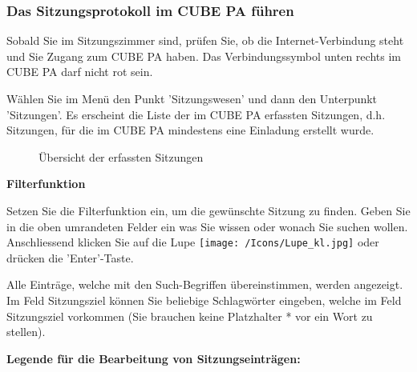 \subsubsection{Das Sitzungsprotokoll im CUBE PA führen}

Sobald Sie im Sitzungszimmer sind, prüfen Sie, ob die Internet-Verbindung steht und Sie Zugang zum CUBE PA haben. Das Verbindungssymbol unten rechts im CUBE PA darf nicht rot sein.

\vspace{\baselineskip}

Wählen Sie im Menü den Punkt 'Sitzungswesen' und dann den Unterpunkt 'Sitzungen'. Es erscheint die Liste der im CUBE PA erfassten Sitzungen, d.h. Sitzungen, für die im CUBE PA mindestens eine Einladung erstellt wurde. 

\begin{figure}[H]
\caption{Übersicht der erfassten Sitzungen}
\end{figure}

\textbf{Filterfunktion }

Setzen Sie die Filterfunktion ein, um die gewünschte Sitzung zu finden. Geben Sie in die oben umrandeten Felder ein was Sie wissen oder wonach Sie suchen wollen. Anschliessend klicken Sie auf die Lupe \texttt{[image: /Icons/Lupe\_kl.jpg]} oder drücken die 'Enter'-Taste.

\vspace{\baselineskip}

Alle Einträge, welche mit den Such-Begriffen übereinstimmen, werden angezeigt. Im Feld Sitzungsziel können Sie beliebige Schlagwörter eingeben, welche im Feld Sitzungsziel vorkommen (Sie brauchen keine Platzhalter * vor ein Wort zu stellen).

\vspace{\baselineskip}

\textbf{Legende für die Bearbeitung von Sitzungseinträgen:}

